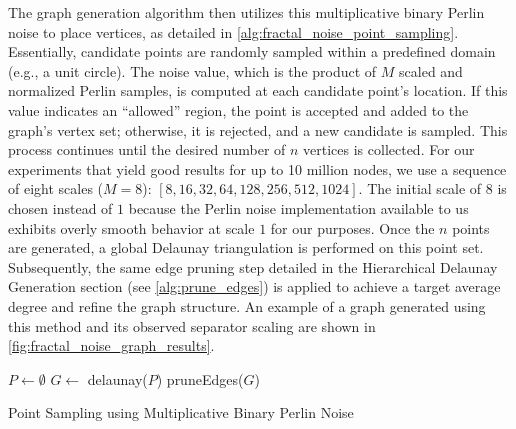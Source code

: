 The graph generation algorithm then utilizes this multiplicative binary Perlin noise to place vertices, as detailed in \cref{alg:fractal_noise_point_sampling}.
Essentially, candidate points are randomly sampled within a predefined domain (e.g., a unit circle). The noise value, which is the product of \(M\) scaled and normalized Perlin samples, is computed at each candidate point's location. If this value indicates an \enquote{allowed} region, the point is accepted and added to the graph's vertex set; otherwise, it is rejected, and a new candidate is sampled. This process continues until the desired number of \(n\) vertices is collected.
For our experiments that yield good results for up to 10 million nodes, we use a sequence of eight scales (\(M=8\)): \([8, 16, 32, 64, 128, 256, 512, 1024]\). The initial scale of \(8\) is chosen instead of \(1\) because the Perlin noise implementation available to us exhibits overly smooth behavior at scale \(1\) for our purposes.
Once the \(n\) points are generated, a global Delaunay triangulation is performed on this point set. Subsequently, the same edge pruning step detailed in the Hierarchical Delaunay Generation section (see \cref{alg:prune_edges}) is applied to achieve a target average degree and refine the graph structure.
An example of a graph generated using this method and its observed separator scaling are shown in \cref{fig:fractal_noise_graph_results}.

\begin{algorithm}[tbhp]
	\BlankLine
	\(P \longleftarrow \emptyset\)\;
	\(G \longleftarrow\) delaunay(\(P\))\;
	pruneEdges(\(G\))\;
	\;
	\caption{Point Sampling using Multiplicative Binary Perlin Noise}
	\label{alg:fractal_noise_point_sampling}
\end{algorithm}


